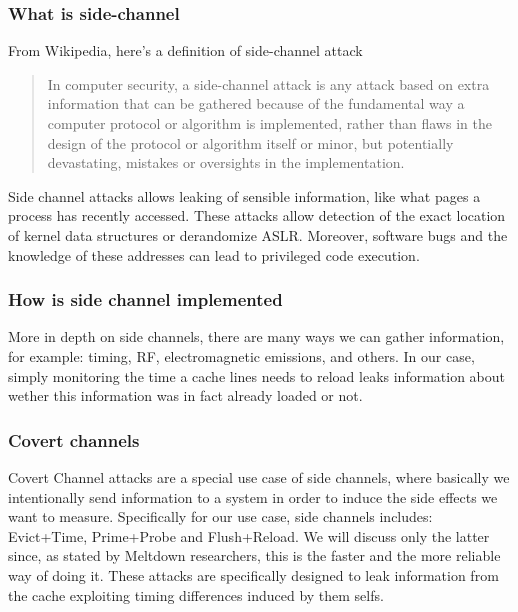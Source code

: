 \subsubsection{What is side-channel}
From Wikipedia, here's a definition of side-channel attack
\begin{quotation}
    In computer security, a side-channel attack is any attack based on extra
    information that can be gathered because of the fundamental way a computer
    protocol or algorithm is implemented, rather than flaws in the design of the
    protocol or algorithm itself or minor, but potentially devastating, mistakes
    or oversights in the implementation.
\end{quotation}
Side channel attacks allows leaking of sensible information, like what pages a process has recently accessed. These attacks
allow detection of the exact location of kernel data structures or derandomize ASLR. Moreover, software bugs and the knowledge of these addresses
can lead to privileged code execution.

\subsubsection{How is side channel implemented}
More in depth on side channels, there are many ways we can gather information, for example: timing, RF, electromagnetic emissions, and others.
In our case, simply monitoring the time a cache lines needs to reload leaks information about wether this information was in fact already loaded or not.
\subsubsection{Covert channels}
Covert Channel attacks are a special use case of side channels, where basically we intentionally send information
to a system in order to induce the side effects we want to measure.
Specifically for our use case, side channels includes: Evict+Time, Prime+Probe and Flush+Reload. We will discuss only the latter since, as stated by
Meltdown researchers, this is the faster and the more reliable way of doing it.
These attacks are specifically designed to leak information from the cache exploiting timing differences induced by them selfs.

